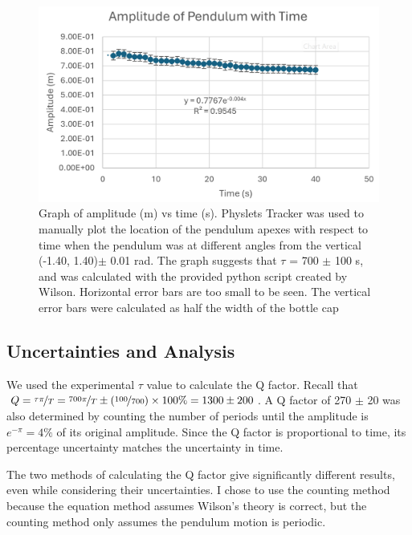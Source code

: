 \documentclass[notitlepage, twocolumn, 12pt]{article}
\begin{document}
    \begin{figure}[H]
        \includegraphics[width=\linewidth]{amplitudeTgraph.png}
        \caption{Graph of amplitude (m) vs time (s). Physlets Tracker was used to manually plot the location of the pendulum apexes with respect to time when the pendulum was at different angles from the vertical (-1.40, 1.40)$\pm$ 0.01 rad. The graph suggests that $\tau$ = 700 $\pm$ 100 \textcolor{WildStrawberry}{s}, and was calculated with the provided python script created by Wilson. Horizontal error bars are too small to be seen. The vertical error bars were calculated as half the width of the bottle cap}
        \label{fig:amplitudeTgraph}
    \end{figure}

    \subsection*{\textcolor{WildStrawberry}{Uncertainties and Analysis}}
    \color{Black}
    We used the experimental $\tau$ value to calculate the Q factor. Recall that $Q = \nicefrac{\tau \pi}{T} = \nicefrac{700\pi}{T} \pm (\nicefrac{100}{700})\times 100\% = 1300 \pm 200$. A Q factor of 270 $\pm$ 20 was also determined by counting the number of periods until the amplitude is $e^{-\pi}=4\%$ of its original amplitude. Since the Q factor is proportional to time, its percentage uncertainty matches the uncertainty in time.
    
    The two methods of calculating the Q factor give significantly different results, even while considering their uncertainties. I chose to use the counting method because the equation method assumes Wilson's theory is correct, but the counting method only assumes the pendulum motion is periodic. %
\end{document}
